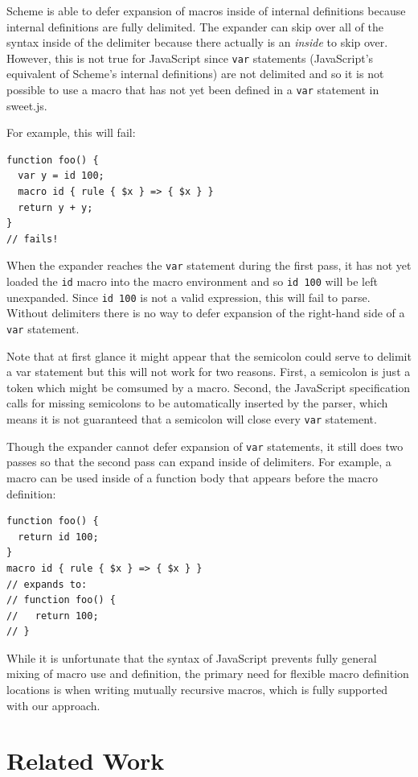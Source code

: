 \documentclass[preprint,10pt]{sigplanconf}
\begin{document}
Scheme is able to defer expansion of macros inside of internal
definitions because internal definitions are fully delimited. The
expander can skip over all of the syntax inside of the delimiter
because there actually is an \emph{inside} to skip over. However, this
is not true for JavaScript since \verb!var! statements
(JavaScript's equivalent of Scheme's internal definitions) are not
delimited and so it is not possible to use a macro that has not yet
been defined in a \verb!var! statement in sweet.js.

For example, this will fail:

\begin{lstlisting}
function foo() {
  var y = id 100;
  macro id { rule { $x } => { $x } }
  return y + y;
}
// fails!
\end{lstlisting}
When the expander reaches the \verb!var! statement during the
first pass, it has not yet loaded the \verb!id! macro into the
macro environment and so \verb!id 100! will be left unexpanded.
Since \verb!id 100! is not a valid expression, this will fail to
parse.
Without delimiters there is no way to defer expansion of the
right-hand side of a \verb!var! statement.

Note that at first glance it might appear that the semicolon could
serve to delimit a var statement but this will not work for two
reasons. First, a semicolon is just a token which might be comsumed by
a macro. Second, the JavaScript specification calls for missing
semicolons to be automatically inserted by the parser, which means
it is not guaranteed that a semicolon will close every \verb!var!
statement.

Though the expander cannot defer expansion of \verb!var!
statements, it still does two passes so that
the second pass can expand inside of delimiters. For example, a macro
can be used inside of a function body that appears before the macro definition:
\begin{lstlisting}
function foo() {
  return id 100;
}
macro id { rule { $x } => { $x } }
// expands to:
// function foo() {
//   return 100;
// }
\end{lstlisting}


While it is unfortunate that the syntax of JavaScript prevents fully
general mixing of macro use and definition, the primary need for
flexible macro definition locations is when writing mutually recursive
macros, which is fully supported with our approach.

\section{Related Work}
\label{sec:related}
\end{document}
